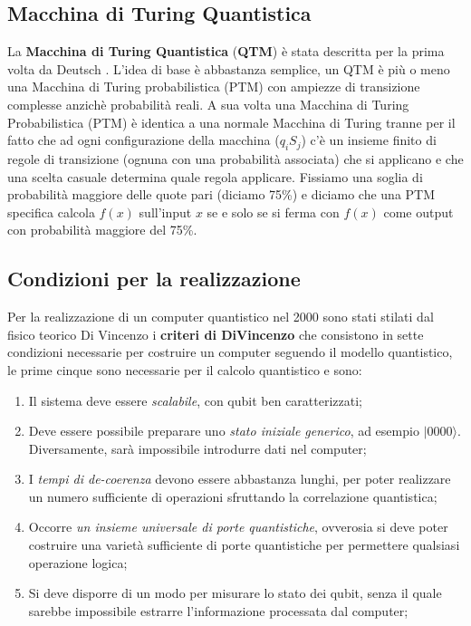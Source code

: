 \subsection{Macchina di Turing Quantistica}
La \textbf{Macchina di Turing Quantistica} (\textbf{QTM}) è stata descritta per la prima volta da Deutsch \cite{deutsch1985quantum}. L'idea di base è abbastanza semplice, un QTM è più o meno una Macchina di Turing probabilistica (PTM) con ampiezze di transizione complesse anzichè probabilità reali. A sua volta una Macchina di Turing Probabilistica (PTM) è identica a una normale Macchina di Turing tranne per il fatto che ad ogni configurazione della macchina (\(q_{i}S_{j}\)) c'è un insieme finito di regole di transizione (ognuna con una probabilità associata) che si applicano e che una scelta casuale determina quale regola applicare. Fissiamo una soglia di probabilità maggiore delle quote pari (diciamo 75\%) e diciamo che una PTM specifica calcola \(f(x)\) sull'input \(x\) se e solo se si ferma con \(f(x)\) come output con probabilità maggiore del 75\%.

\subsection{Condizioni per la realizzazione}
Per la realizzazione di un computer quantistico nel 2000 sono stati stilati dal fisico teorico Di Vincenzo i \textbf{criteri di DiVincenzo} \cite{DiVincenzo_2000} che consistono in sette condizioni necessarie per costruire un computer seguendo il modello quantistico, le prime cinque sono necessarie per il calcolo quantistico e sono:

\begin{enumerate}
  \item Il sistema deve essere \textit{scalabile}, con qubit ben caratterizzati;
  \item Deve essere possibile preparare uno \textit{stato iniziale generico}, ad esempio \(| 0000 \rangle \). Diversamente, sarà impossibile introdurre dati nel computer;
  \item I \textit{tempi di de-coerenza} devono essere abbastanza lunghi, per poter realizzare un numero sufficiente di operazioni sfruttando la correlazione quantistica;
  \item Occorre \textit{un insieme universale di porte quantistiche}, ovverosia si deve poter costruire una varietà sufficiente di porte quantistiche per permettere qualsiasi operazione logica;
  \item Si deve disporre di un modo per misurare lo stato dei qubit, senza il quale sarebbe impossibile estrarre l'informazione processata dal computer;
\end{enumerate}

